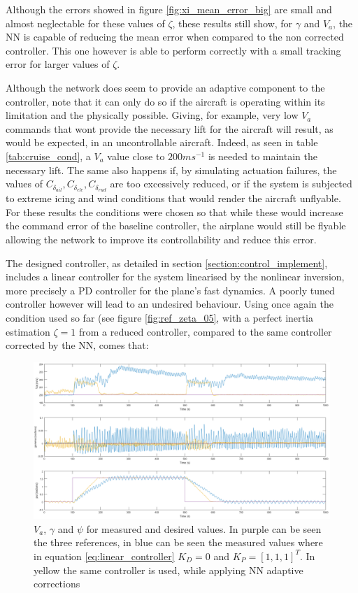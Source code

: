 Although the errors showed in figure \ref{fig:xi_mean_error_big} are small and almost neglectable for these values of $\zeta$, these results still show, for $\gamma$ and $V_a$, the NN is capable of reducing the mean error when compared to the non corrected controller. This one however is able to perform correctly with a small tracking error for larger values of $\zeta$.

Although the network does seem to provide an adaptive component to the controller, note that it can only do so if the aircraft is operating within its limitation and the physically possible. Giving, for example, very low $V_a$ commands that wont provide the necessary lift for the aircraft will result, as would be expected, in an uncontrollable aircraft. Indeed, as seen in table \ref{tab:cruise_cond}, a $V_a$ value close to $200ms^{-1}$ is needed to maintain the necessary lift. The same also happens if, by simulating actuation failures, the values of $C_{\delta_{ail}}, C_{\delta_{ele}}, C_{\delta_{rud}}$ are too excessively reduced, or if the system is subjected to extreme icing and wind conditions that would render the aircraft unflyable. For these results the conditions were chosen so that while these would increase the command error of the baseline controller, the airplane would still be flyable allowing the network to improve its controllability and reduce this error.

The designed controller, as detailed in section \ref{section:control_implement}, includes a linear controller for the system linearised by the nonlinear inversion, more precisely a PD controller for the plane's fast dynamics. A poorly tuned controller however will lead to an undesired behaviour. Using once again the condition used so far (see figure \ref{fig:ref_zeta_05}, with a perfect inertia estimation $\zeta = 1$ from a reduced controller, compared to the same controller corrected by the NN, comes that:

\begin{figure}[H]
\centering
\includegraphics[width=1.1\textwidth]{Figures/Results/ref_bad_control.png}
\caption[Poorly tuned controller comparison]{$V_a$, $\gamma$ and $\psi$ for measured and desired values. In purple can be seen the three references, in blue can be seen the measured values where in equation \ref{eq:linear_controller} $K_D=0$ and $K_P = [1,1,1]^T$. In yellow the same controller is used, while applying NN adaptive corrections}
\label{fig:ref_bad_control}
\end{figure}


